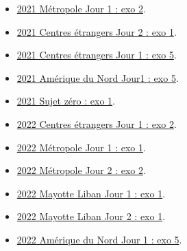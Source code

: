 \documentclass[
  a4paper,
  DIV=11,
  numbers=noendperiod]{scrartcl}
\providecommand{\tightlist}{%
  \setlength{\itemsep}{0pt}\setlength{\parskip}{0pt}}\usepackage{longtable,booktabs,array}
\begin{document}
\begin{itemize}
\tightlist
\item
  \href{../annales//2021_Metropole_CL_1.pdf}{2021 Métropole Jour 1 : exo
  2}.
\item
  \href{../annales//2021_CentresEtrangers_2.pdf}{2021 Centres étrangers
  Jour 2 : exo 1}.
\item
  \href{../annales//2021_CentresEtrangers_1.pdf}{2021 Centres étrangers
  Jour 1 : exo 5}.
\item
  \href{../annales//2021_AmeriqueDuNord_1.pdf}{2021 Amérique du Nord
  Jour1 : exo 5}.
\item
  \href{../annales//2021_Sujet_0.pdf}{2021 Sujet zéro : exo 1}.
\item
  \href{../annales//2022_CentresEtrangers_1.pdf}{2022 Centres étrangers
  Jour 1 : exo 2}.
\item
  \href{../annales//2022_Metropole_Jour1.pdf}{2022 Métropole Jour 1 :
  exo 1}.
\item
  \href{../annales//2022_Metropole_Jour2.pdf}{2022 Métropole Jour 2 :
  exo 2}.
\item
  \href{../annales//2022_Mayotte_Liban_1.pdf}{2022 Mayotte Liban Jour 1
  : exo 1}.
\item
  \href{../annales//2022_Mayotte_Liban_2.pdf}{2022 Mayotte Liban Jour 2
  : exo 1}.
\item
  \href{../annales//2022_AmeriqueDuNord_1.pdf}{2022 Amérique du Nord
  Jour 1 : exo 5}.
\end{itemize}
\end{document}
